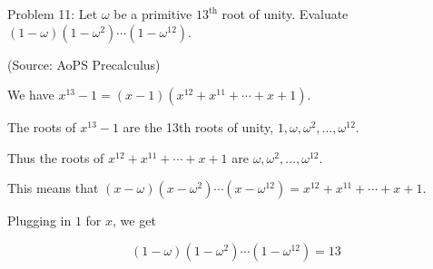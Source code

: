 Problem 11: Let $\omega$ be a primitive $13^{\text{th}}$ root of unity. Evaluate $(1 - \omega)(1 - \omega^2) \dotsm (1 - \omega^{12})$.

(Source: AoPS Precalculus)

We have $x^{13} - 1 = (x  - 1)(x^{12} + x^{11} + \cdots + x + 1)$.

The roots of $x^{13} - 1$ are the 13th roots of unity, $1, \omega, \omega^2, \hdots, \omega^{12}$.

Thus the roots of $x^{12} + x^{11} + \cdots + x + 1$ are $\omega, \omega^2, \hdots, \omega^{12}$.

This means that $(x - \omega)(x - \omega^2)\cdots(x - \omega^{12}) = x^{12} + x^{11} + \cdots + x + 1$.

Plugging in $1$ for $x$, we get

$$ (1 - \omega)(1 - \omega^2)\cdots(1 - \omega^{12}) = \boxed{13} $$
